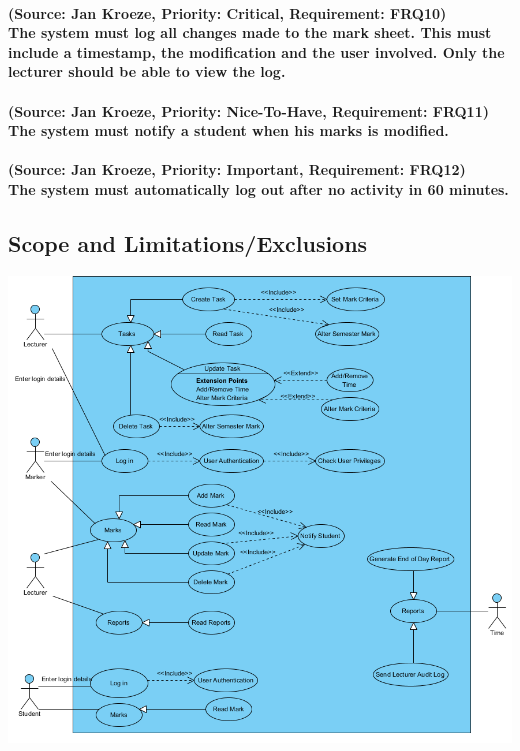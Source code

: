 \documentclass[12pt]{article}
\begin{document}
  \paragraph{(Source: Jan Kroeze, Priority: Critical, Requirement: FRQ10) \\
  The system must log all changes made to the mark sheet. This must include a timestamp, the modification and the user involved. Only the lecturer should be able to view the log.}
  \paragraph{(Source: Jan Kroeze, Priority: Nice-To-Have, Requirement: FRQ11) \\
  The system must notify a student when his marks is modified.}
  \paragraph{(Source: Jan Kroeze, Priority: Important, Requirement: FRQ12) \\
  The system must automatically log out after no activity in 60 minutes.}
  \subsection{Scope and Limitations/Exclusions}
  \begin{center}
  \advance\leftskip-2.0cm
  \includegraphics[width=180mm]{UseCaseDiagram1.png}  
  \end{center}
\end{document}
